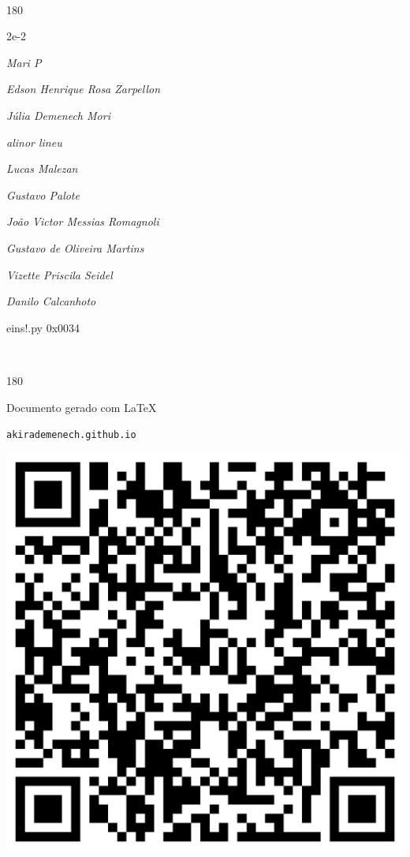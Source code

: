 \documentclass[12pt]{article}
\begin{document}
	\ 
	\vfill
	\begin{turn}{180}	
		\begin{minipage}{\textwidth}
		  	\ttfamily %
			\centering
			{\Huge 2e-2}
		  
			\hfill
		  
			

\textit{\small Mari P}

\textit{\small Edson Henrique Rosa Zarpellon}

\textit{\small Júlia Demenech Mori}

\textit{\small alinor lineu}

\textit{\small Lucas Malezan}

\textit{\small Gustavo Palote}

\textit{\small João Victor Messias Romagnoli}

\textit{\small Gustavo de Oliveira Martins}

\textit{\small Vizette Priscila Seidel}

\textit{\small Danilo Calcanhoto}

\bigskip

eins!.py
0x0034


		\end{minipage}	
	\end{turn}
	\vfill
	\

\pagebreak

	\begin{turn}{180}	
		\begin{minipage}{\textwidth}		  
		  Documento gerado com \LaTeX			
		  
		  \texttt{akirademenech.github.io}

		  \includegraphics[height=0.3\textheight]{2e-2.pdf}

		\end{minipage}	
	\end{turn}  
		  
\end{document}
